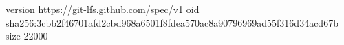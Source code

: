 version https://git-lfs.github.com/spec/v1
oid sha256:3cbb2f46701afd2cbd968a6501f8fdea570ac8a90796969ad55f316d34acd67b
size 22000
